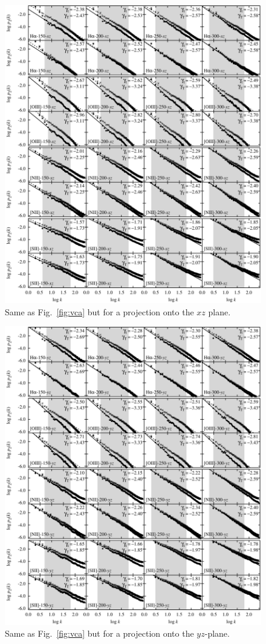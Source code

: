 \documentclass[useAMS,usenatbib]{mn2e}
\begin{document}
 \begin{figure}
 \centering
 \includegraphics[width=\textwidth]{vca-all-xz}
 \caption{Same as Fig.~\protect\ref{fig:vca} but for a projection onto the $xz$ plane.}
 \label{fig:vcaxz}
 \end{figure}
 \begin{figure}
 \centering
 \includegraphics[width=\textwidth]{vca-all-yz}
 \caption{Same as Fig.~\protect\ref{fig:vca} but for a projection onto the $yz$-plane.}
 \label{fig:vcayz}
 \end{figure}


\label{lastpage}
\end{document}
